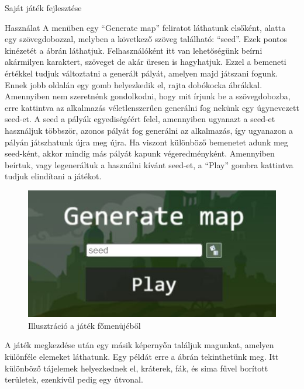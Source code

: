 \begin{MyChapter}{Saját játék fejlesztése}
\begin{MySection}{Használat}
		A menüben egy ``Generate map'' feliratot láthatunk elsőként, alatta egy szövegdobozzal, melyben a következő szöveg található: ``seed''. Ezek pontos kinézetét a  ábrán láthatjuk. Felhasználóként itt van lehetőségünk beírni akármilyen karaktert, szöveget de akár üresen is hagyhatjuk. Ezzel a bemeneti értékkel tudjuk változtatni a generált pályát, amelyen majd játszani fogunk.
		Ennek jobb oldalán egy gomb helyezkedik el, rajta dobókocka ábrákkal. Amennyiben nem szeretnénk gondolkodni, hogy mit írjunk be a szövegdobozba, erre kattintva az alkalmazás véletlenszerűen generálni fog nekünk egy úgynevezett seed-et.
		A seed a pályák egyediségéért felel, amennyiben ugyanazt a seed-et használjuk többször, azonos pályát fog generálni az alkalmazás, így ugyanazon a pályán játszhatunk újra meg újra. Ha viszont különböző bemenetet adunk meg seed-ként, akkor mindig más pályát kapunk végeredményként. 
		Amennyiben beírtuk, vagy legeneráltuk a használni kívánt seed-et, a ``Play'' gombra kattintva tudjuk elindítani a játékot.
		
		\begin{figure}[H]
			\centering
			\includegraphics[scale=0.68]{kepek/jatekHasznalat/fomenu}
			\caption{Illusztráció a játék főmenüjéből}
			\label{fig:jatekHasznalat:fomenu}
		\end{figure}
		
		A játék megkezdése után egy másik képernyőn találjuk magunkat, amelyen különféle elemeket láthatunk. Egy példát erre a  ábrán tekinthetünk meg. Itt különböző tájelemek helyezkednek el, kráterek, fák, és sima fűvel borított területek, ezenkívül pedig egy útvonal. 
		

\end{MySection}
\end{MyChapter}
